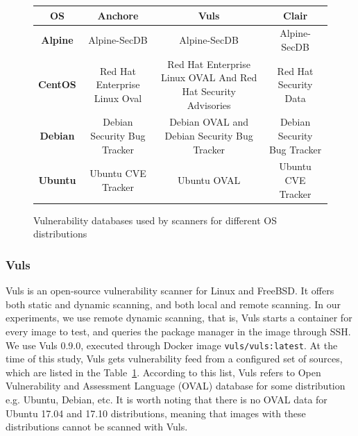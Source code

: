 \documentclass[a4paper,num-refs]{oup-contemporary}
\begin{document}

\begin{figure}
\begin{tabular}{ |c|c|c|c| }
 \hline
\textbf{OS} &	\textbf{Anchore} &	\textbf{Vuls} &	\textbf{Clair} \\
\hline
	\textbf{Alpine} & Alpine-SecDB &	Alpine-SecDB &	Alpine-SecDB \\
\hline
	\textbf{CentOS} & Red Hat Enterprise Linux Oval & Red Hat Enterprise Linux OVAL And Red Hat Security Advisories & Red Hat Security Data \\
\hline
	\textbf{Debian} & Debian Security Bug Tracker &	Debian OVAL and Debian Security Bug Tracker & Debian Security Bug Tracker \\
\hline
	\textbf{Ubuntu} & Ubuntu CVE Tracker &	Ubuntu OVAL &	Ubuntu CVE Tracker \\
 \hline
\end{tabular}
\caption{Vulnerability databases used by scanners for different OS distributions}
\label{database}
\end{figure}

\subsubsection{Vuls}

Vuls is an open-source vulnerability scanner for Linux and FreeBSD. It
offers both static and dynamic scanning, and both local and remote
scanning. In our experiments, we use remote dynamic scanning, that is, Vuls
starts a container for every image to test, and queries the package manager
in the image through SSH. We use Vuls 0.9.0, executed through Docker image
\texttt{vuls/vuls:latest}. At the time of this study, Vuls gets vulnerability feed
from a configured set of sources, which are listed in the Table~\ref{database}.
According to this list, Vuls
refers to Open Vulnerability and Assessment Language (OVAL) database for some distribution e.g. Ubuntu, Debian, etc.
It is worth noting that there is
no OVAL data for Ubuntu 17.04 and 17.10 distributions, meaning that images
with these distributions cannot be scanned with Vuls.
\end{document}
